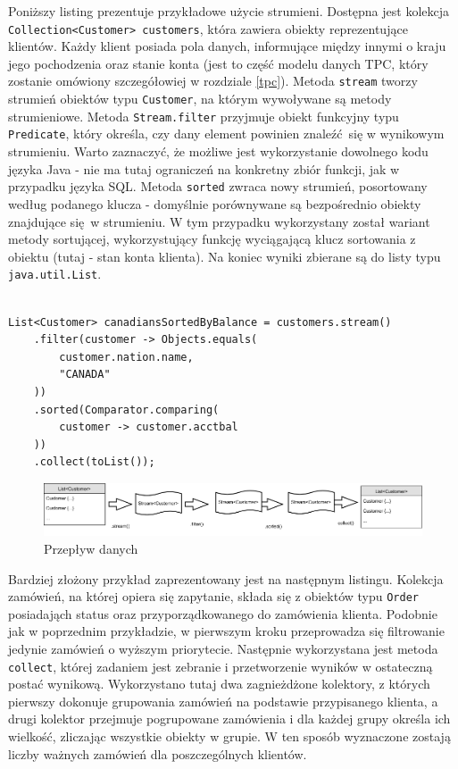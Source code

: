 \documentclass[12pt]{extarticle}
\begin{document}
    Poniższy listing prezentuje przykładowe użycie strumieni. Dostępna jest kolekcja \newline \texttt{Collection<Customer> customers}, która zawiera obiekty reprezentujące klientów. Każdy klient posiada pola danych, informujące między innymi o kraju jego pochodzenia oraz stanie konta (jest to część modelu danych TPC, który zostanie omówiony szczegółowiej w rozdziale \ref{tpc}). Metoda \texttt{stream} tworzy strumień obiektów typu \texttt{Customer}, na którym wywoływane są metody strumieniowe. Metoda \texttt{Stream.filter} przyjmuje obiekt funkcyjny typu \texttt{Predicate}, który określa, czy dany element powinien znaleźć się w wynikowym strumieniu. Warto zaznaczyć, że możliwe jest wykorzystanie dowolnego kodu języka Java - nie ma tutaj ograniczeń na konkretny zbiór funkcji, jak w przypadku języka SQL. Metoda \texttt{sorted} zwraca nowy strumień, posortowany według podanego klucza - domyślnie porównywane są bezpośrednio obiekty znajdujące się w strumieniu. W tym przypadku wykorzystany został wariant metody sortującej, wykorzystujący funkcję wyciągającą klucz sortowania z obiektu (tutaj - stan konta klienta). Na koniec wyniki zbierane są do listy typu \texttt{java.util.List}. 

\begin{lstlisting}[label=streamexample, caption=Przykładowe wykorzystanie Stream API]

List<Customer> canadiansSortedByBalance = customers.stream()
    .filter(customer -> Objects.equals(
        customer.nation.name,
        "CANADA"
    ))
    .sorted(Comparator.comparing(
        customer -> customer.acctbal
    ))
    .collect(toList());

\end{lstlisting}

\begin{figure}[h]
\centering
\includegraphics[width=14cm]{flow.png}
\caption{Przepływ danych}
\label{fig:flow}
\end{figure}

    Bardziej złożony przykład zaprezentowany jest na następnym listingu. Kolekcja zamówień, na której opiera się zapytanie, składa się z obiektów typu \texttt{Order} posiadająch status oraz przyporządkowanego do zamówienia klienta. Podobnie jak w poprzednim przykładzie, w pierwszym kroku przeprowadza się filtrowanie jedynie zamówień o wyższym priorytecie. Następnie wykorzystana jest metoda \texttt{collect}, której zadaniem jest zebranie i przetworzenie wyników w ostateczną postać wynikową. Wykorzystano tutaj dwa zagnieżdżone kolektory, z których pierwszy dokonuje grupowania zamówień na podstawie przypisanego klienta, a drugi kolektor przejmuje pogrupowane zamówienia i dla każdej grupy określa ich wielkość, zliczając wszystkie obiekty w grupie. W ten sposób wyznaczone zostają liczby ważnych zamówień dla poszczególnych klientów.
\end{document}
